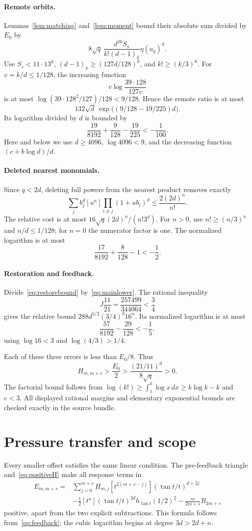 \documentclass[11pt,a4paper]{article}
\theoremstyle{remark}\newtheorem*{ednote}{Editorial note (ProveIt, 2026-10-01)}
\begin{document}
\paragraph{Remote orbits.}
Lemmas~\ref{lem:matching} and~\ref{lem:moment} bound their absolute sum divided by $E_0$ by
\[
8\sqrt q\,\frac{d^{2k}S_s}{k!(d-1)_k}\eta(a_q)^d.
\]
Use $S_s<11\cdot13^k$, $(d-1)_k\ge(127d/128)^k$, and $k!\ge(k/3)^k$. For $v=k/d\le1/128$, the increasing function
\[
v\log\frac{39\cdot128}{127v}
\]
is at most $\log(39\cdot128^2/127)/128<9/128$. Hence the remote ratio is at most
\[
132\sqrt d\,\exp\bigl((9/128-19/225)d\bigr).
\]
Its logarithm divided by $d$ is bounded by
\[
\frac{19}{8192}+\frac9{128}-\frac{19}{225}<-\frac1{100}.
\]
Here and below we use $d\ge4096$, $\log4096<9$, and the decreasing function $(c+b\log d)/d$.

\paragraph{Deleted nearest monomials.}
Since $q<2d$, deleting full powers from the nearest product removes exactly
\[
\sum_jb_j^d[u^n]\prod_{i\ne j}(1+ub_i)^d\le\frac{2(2d)^n}{n!}.
\]
The relative cost is at most $16\sqrt q(2d)^n/(n!3^d)$. For $n>0$, use $n!\ge(n/3)^n$ and $n/d\le1/128$; for $n=0$ the numerator factor is one. The normalized logarithm is at most
\[
\frac{17}{8192}+\frac8{128}-1<-\frac12.
\]

\paragraph{Restoration and feedback.}
Divide~\eqref{eq:restorebound} by~\eqref{eq:mainlower}. The rational inequality
\[
J\frac{11}{21}=\frac{257499}{344064}<\frac34
\]
gives the relative bound $288d^{5/2}(3/4)^d16^n$. Its normalized logarithm is at most
\[
\frac{57}{8192}-\frac{29}{128}<-\frac15,
\]
using $\log16<3$ and $\log(4/3)>1/4$.

Each of these three errors is less than $E_0/8$. Thus
\begin{equation}\label{eq:positiveH}
H_{m,m+s}>\frac{E_0}{2}>\frac{(21/11)^d}{8\sqrt q}>0.
\end{equation}
The factorial bound follows from $\log(k!)\ge\int_1^k\log x\,dx\ge k\log k-k$ and $e<3$. All displayed rational margins and elementary exponential bounds are checked exactly in the source bundle.

\section{Pressure transfer and scope}
Every smaller offset satisfies the same linear condition. The pre-feedback triangle and~\eqref{eq:positiveH} make all response terms in
\begin{align*}
E_{m,m+s}={}&\sum_{j=0}^{m+s}H_{m,j}[t^{2(m+s-j)}](\tan t/t)^{d+2j}\\
&-\tfrac12[t^n](\tan t/t)^{2d}h_{\tan t}(1/2)^2
-\frac{m}{2m+s}R_{2m+s}
\end{align*}
positive, apart from the two explicit subtractions. This formula follows from~\eqref{eq:feedback}; the cubic logarithm begins at degree $3d>2d+n$.
\end{document}
